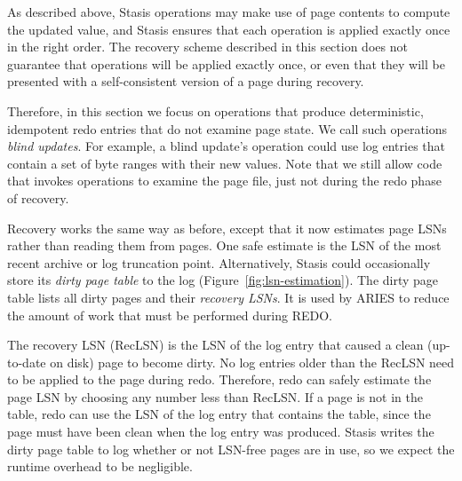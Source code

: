 \documentclass[letterpaper,twocolumn,10pt]{article}
\newcommand{\yad}{Stasis\xspace}
\begin{document}
As described above, \yad operations may make use of page contents to
compute the updated value, and \yad ensures that each operation is
applied exactly once in the right order. The recovery scheme described
in this section does not guarantee that operations will be
applied exactly once, or even that they will be presented with a
self-consistent version of a page during recovery.

Therefore, in this section we focus on operations that produce
deterministic, idempotent redo entries that do not examine page state.
We call such operations {\em blind updates}.  For example, a
blind update's operation could use log entries that contain a
set of byte ranges with their new values.  Note that we still allow
code that invokes operations to examine the page file, just not during
the redo phase of recovery.

Recovery works the same way as before, except that it now estimates
page LSNs rather than reading them from pages.  One safe estimate
is the LSN of the most recent archive or log truncation point.
Alternatively, \yad could occasionally store its {\em dirty page
table} to the log (Figure~\ref{fig:lsn-estimation}).  The dirty page
table lists all dirty pages and their {\em recovery LSNs}.  
It is used by ARIES to reduce
the amount of work that must be performed during REDO.

The recovery LSN (RecLSN) is the LSN of the log entry 
that caused a clean (up-to-date on disk) page to become dirty.  No log
entries older than the RecLSN need to be applied to the page during
redo.  Therefore, redo can safely estimate the page LSN by choosing any number less than RecLSN.
If a page is not in the table, redo can use the LSN of the log
entry that contains the table, since the page must have been clean
when the log entry was produced.  \yad writes the dirty page table to
log whether or not LSN-free pages are in use, so we expect the runtime
overhead to be negligible.

\end{document}
